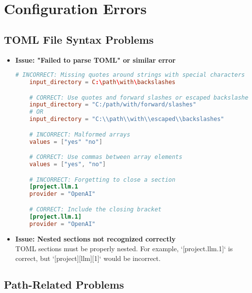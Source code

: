 \section{Configuration Errors}

\subsection{TOML File Syntax Problems}

\begin{itemize}
    \item \textbf{Issue: "Failed to parse TOML" or similar error}

    \begin{configbox}
    \begin{lstlisting}[language=TOML]
    # INCORRECT: Missing quotes around strings with special characters
    input_directory = C:\path\with\backslashes

    # CORRECT: Use quotes and forward slashes or escaped backslashes
    input_directory = "C:/path/with/forward/slashes"
    # OR
    input_directory = "C:\\path\\with\\escaped\\backslashes"

    # INCORRECT: Malformed arrays
    values = ["yes" "no"]

    # CORRECT: Use commas between array elements
    values = ["yes", "no"]

    # INCORRECT: Forgetting to close a section
    [project.llm.1
    provider = "OpenAI"

    # CORRECT: Include the closing bracket
    [project.llm.1]
    provider = "OpenAI"
    \end{lstlisting}
    \end{configbox}

    \item \textbf{Issue: Nested sections not recognized correctly}
    \\
    TOML sections must be properly nested. For example, `[project.llm.1]` is correct, but `[project][llm][1]` would be incorrect.
\end{itemize}

\subsection{Path-Related Problems}

